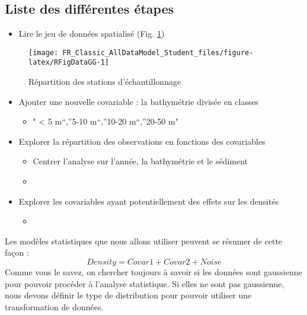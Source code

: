 \documentclass[french,a4paper]{article}
\providecommand{\tightlist}{%
  \setlength{\itemsep}{0pt}\setlength{\parskip}{0pt}}
\begin{document}
\hypertarget{liste-des-differentes-etapes}{%
\subsection{Liste des différentes étapes}\label{liste-des-differentes-etapes}}

\begin{itemize}
\tightlist
\item
  Lire le jeu de données spatialisé (Fig. \ref{fig:RFigDataGG})
\end{itemize}



\begin{figure}[!h]

{\centering \texttt{[image: FR\_Classic\_AllDataModel\_Student\_files/figure-latex/RFigDataGG-1]} 

}

\caption{Répartition des stations d'échantillonnage}\label{fig:RFigDataGG}
\end{figure}

\begin{itemize}
\tightlist
\item
  Ajouter une nouvelle covariable : la bathymétrie divisée en classes

  \begin{itemize}
  \tightlist
  \item
    " \textless{} 5 m``,''5-10 m``,''10-20 m``,''20-50 m"
  \end{itemize}
\item
  Explorer la répartition des observations en fonctions des covariables

  \begin{itemize}
  \item
    Centrer l'analyse sur l'année, la bathymétrie et le sédiment
  \item
  \end{itemize}
\item
  Explorer les covariables ayant potentiellement des effets sur les densités

  \begin{itemize}
  \item
  \end{itemize}
\end{itemize}

Les modèles statistiques que nous allons utiliser peuvent se résumer de cette façon :
\[Density = Covar1 + Covar2 + Noise\]
Comme vous le savez, on chercher toujours à savoir si les données sont gaussienne pour pouvoir procéder à l'analyse statistique. Si elles ne sont pas gaussienne, nous devons définir le type de distribution pour pouvoir utiliser une transformation de données.
\end{document}
